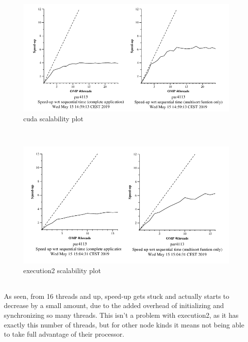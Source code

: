 \documentclass[12]{article}
\begin{document}
\\
\medskip
\begin{figure}[H]
    \centering
    \includegraphics[scale=0.75]{images/cudaStrong.png}
    \caption{cuda scalability plot}
    \label{executionstrong}
\end{figure}
\\
\medskip
\begin{figure}[H]
    \centering
    \includegraphics[scale=0.75]{images/execution2Strong.png}
    \caption{execution2 scalability plot}
    \label{executionstrong}
\end{figure}
\\
As seen, from 16 threads and up, speed-up gets stuck and actually starts to decrease by a small amount, due to the added overhead of initializing and synchronizing so many threads. This isn't a problem with execution2, as it has exactly this number of threads, but for other node kinds it means not being able to take full advantage of their processor.
\end{document}
